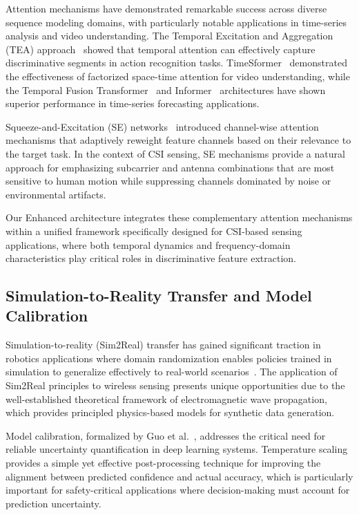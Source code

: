 \documentclass[journal]{IEEEtran}
\begin{document}
Attention mechanisms have demonstrated remarkable success across diverse sequence modeling domains, with particularly notable applications in time-series analysis and video understanding. The Temporal Excitation and Aggregation (TEA) approach~\cite{li2020tea} showed that temporal attention can effectively capture discriminative segments in action recognition tasks. TimeSformer~\cite{bertasius2021timesformer} demonstrated the effectiveness of factorized space-time attention for video understanding, while the Temporal Fusion Transformer~\cite{lim2021tft} and Informer~\cite{zhou2021informer} architectures have shown superior performance in time-series forecasting applications.

Squeeze-and-Excitation (SE) networks~\cite{se_networks2018} introduced channel-wise attention mechanisms that adaptively reweight feature channels based on their relevance to the target task. In the context of CSI sensing, SE mechanisms provide a natural approach for emphasizing subcarrier and antenna combinations that are most sensitive to human motion while suppressing channels dominated by noise or environmental artifacts.

Our Enhanced architecture integrates these complementary attention mechanisms within a unified framework specifically designed for CSI-based sensing applications, where both temporal dynamics and frequency-domain characteristics play critical roles in discriminative feature extraction.

\subsection{Simulation-to-Reality Transfer and Model Calibration}

Simulation-to-reality (Sim2Real) transfer has gained significant traction in robotics applications where domain randomization enables policies trained in simulation to generalize effectively to real-world scenarios~\cite{peng2018sim2real}. The application of Sim2Real principles to wireless sensing presents unique opportunities due to the well-established theoretical framework of electromagnetic wave propagation, which provides principled physics-based models for synthetic data generation.

Model calibration, formalized by Guo et al.~\cite{calibration_guo2017}, addresses the critical need for reliable uncertainty quantification in deep learning systems. Temperature scaling provides a simple yet effective post-processing technique for improving the alignment between predicted confidence and actual accuracy, which is particularly important for safety-critical applications where decision-making must account for prediction uncertainty.
\end{document}

